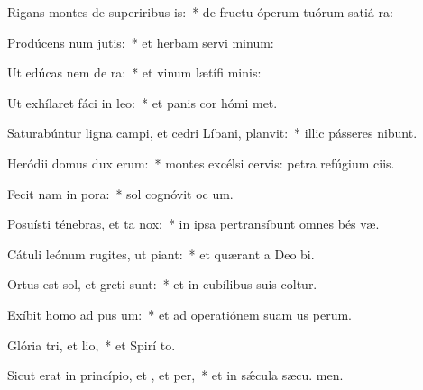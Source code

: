 \item Rigans montes de superiribus is:~* de fructu óperum tuórum satiá ra:
\item Prodúcens num jutis:~* et herbam servi minum:
\item Ut edúcas nem de ra:~* et vinum lætífi  minis:
\item Ut exhílaret fáci in leo:~* et panis cor hómi met.
\item Saturabúntur ligna campi, et cedri Líbani,  planvit:~* illic pásseres nibunt.
\item Heródii domus dux  erum:~* montes excélsi cervis: petra refúgium ciis.
\item Fecit nam in pora:~* sol cognóvit oc um.
\item Posuísti ténebras, et ta  nox:~* in ipsa pertransíbunt omnes bés væ.
\item Cátuli leónum rugites, ut piant:~* et quærant a Deo  bi.
\item Ortus est sol, et greti sunt:~* et in cubílibus suis coltur.
\item Exíbit homo ad pus um:~* et ad operatiónem suam us  perum.
\item Glória tri, et lio,~* et Spirí to.
\item Sicut erat in princípio, et , et per,~* et in sǽcula sæcu. men.
